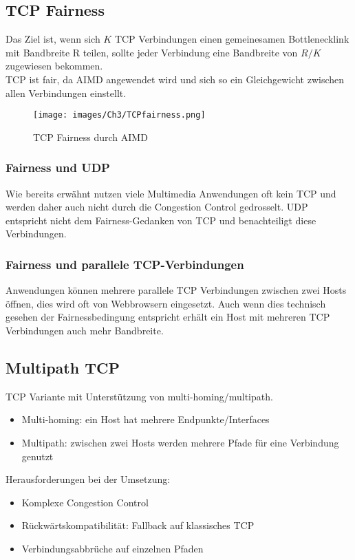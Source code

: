 \subsection{TCP Fairness}
Das Ziel ist, wenn sich $K$ TCP Verbindungen einen gemeinesamen Bottlenecklink mit Bandbreite R teilen, sollte jeder Verbindung eine Bandbreite von $R/K$ zugewiesen bekommen.\\
\noindent TCP ist fair, da AIMD angewendet wird und sich so ein Gleichgewicht zwischen allen Verbindungen einstellt.
\begin{figure}[H]
    \centering
    \texttt{[image: images/Ch3/TCPfairness.png]}
    \caption{TCP Fairness durch AIMD}
    \label{Ch03-TCP-fairness}
\end{figure}

\subsubsection{Fairness und UDP}
Wie bereits erwähnt nutzen viele Multimedia Anwendungen oft kein TCP und werden daher auch nicht durch die Congestion Control gedrosselt. UDP entspricht nicht dem Fairness-Gedanken von TCP und benachteiligt diese Verbindungen.

\subsubsection{Fairness und parallele TCP-Verbindungen}
Anwendungen können mehrere parallele TCP Verbindungen zwischen zwei Hosts öffnen, dies wird oft von Webbrowsern eingesetzt. Auch wenn dies technisch gesehen der Fairnessbedingung entspricht erhält ein Host mit mehreren TCP Verbindungen auch mehr Bandbreite.

\subsection{Multipath TCP}
TCP Variante mit Unterstützung von multi-homing/multipath.
\begin{itemize}
    \item Multi-homing: ein Host hat mehrere Endpunkte/Interfaces
    \item Multipath: zwischen zwei Hosts werden mehrere Pfade für eine Verbindung genutzt
\end{itemize}
\noindent Herausforderungen bei der Umsetzung:
\begin{itemize}
    \item Komplexe Congestion Control
    \item Rückwärtskompatibilität: Fallback auf klassisches TCP
    \item Verbindungsabbrüche auf einzelnen Pfaden
\end{itemize}